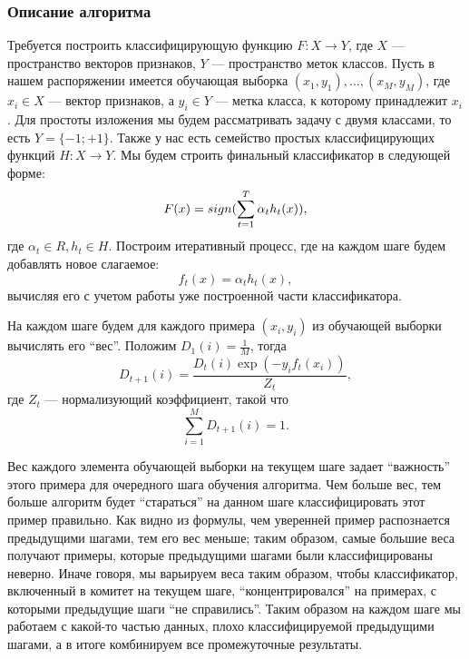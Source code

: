 \subsubsection{Описание алгоритма}
Требуется построить классифицирующую функцию $F : X \to Y$, где $X$ --- пространство векторов признаков, $Y$ --- пространство меток классов. Пусть в нашем распоряжении имеется обучающая выборка $(x_1, y_1), \dots, (x_M, y_M)$, где $x_i \in X$ --- вектор признаков, а $y_i \in Y$ --- метка класса, к которому принадлежит $x_i$. Для простоты изложения мы будем рассматривать задачу с двумя классами, то есть $Y = \{-1; +1\}$. Также у нас есть семейство простых классифицирующих функций $H: X \to Y$. Мы будем строить финальный классификатор в следующей форме:
\begin{displaymath}
  F(x) = sign(\sum_{t = 1}^T{\alpha_th_t(x)}),
\end{displaymath}
где $\alpha_t \in R, h_t \in H.$ Построим итеративный процесс, где на каждом шаге будем добавлять новое слагаемое:
\begin{displaymath}
  f_t(x) = \alpha_th_t(x),
\end{displaymath}
вычисляя его с учетом работы уже построенной части классификатора.

На каждом шаге будем для каждого примера $(x_i, y_i)$ из обучающей выборки вычислять его ``вес''. Положим $D_1(i) = \frac{1}{M}$, тогда
\begin{displaymath}
  D_{t + 1}(i) = \frac{D_t(i)\exp{(-y_if_t(x_i))}}{Z_t},
\end{displaymath}
где $Z_t$ --- нормализующий коэффициент, такой что
\begin{displaymath}
  \sum_{i = 1}^M{D_{t + 1}(i)} = 1.
\end{displaymath}

Вес каждого элемента обучающей выборки на текущем шаге задает ``важность'' этого примера для очередного шага обучения алгоритма. Чем больше вес, тем больше алгоритм будет ``стараться'' на данном шаге классифицировать этот пример правильно. Как видно из формулы, чем уверенней пример распознается предыдущими шагами, тем его вес меньше; таким образом, самые большие веса получают примеры, которые предыдущими шагами были классифицированы неверно. Иначе говоря, мы варьируем веса таким образом, чтобы классификатор, включенный в комитет на текущем шаге, ``концентрировался'' на примерах,  с которыми предыдущие шаги ``не справились''. Таким образом на каждом шаге мы работаем с какой-то частью данных, плохо классифицируемой предыдущими шагами, а в итоге комбинируем все промежуточные результаты.

